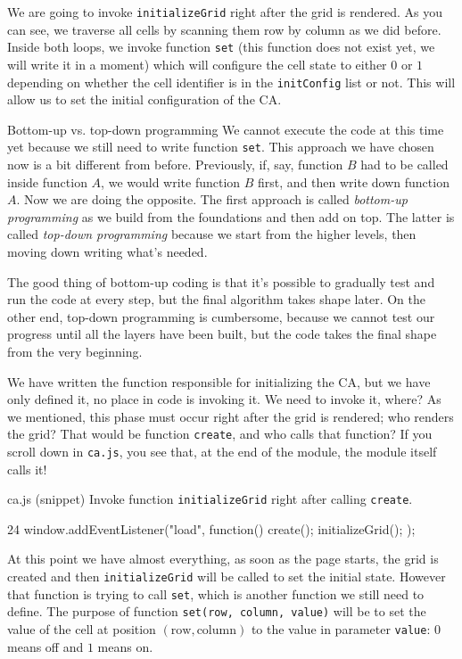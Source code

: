 We are going to invoke \texttt{initializeGrid} right after the grid is rendered. As you can see, we traverse
all cells by scanning them row by column as we did before. Inside both loops, we invoke function \texttt{set}
(this function does not exist yet, we will write it in a moment) which will configure the cell state to either
$0$ or $1$ depending on whether the cell identifier is in the \texttt{initConfig} list or not. This will allow us
to set the initial configuration of the CA.

\begin{important}{Bottom-up vs. top-down programming}
We cannot execute the code at this time yet because we still need to write function \texttt{set}.
This approach we have chosen now is a bit different from before. Previously, if, say, function $B$ had to
be called inside function $A$, we would write function $B$ first, and then write down function $A$. Now we are
doing the opposite. The first approach is called \textit{bottom-up programming}
as we build from the foundations and then add on top.
The latter is called \textit{top-down programming} because we start from the higher levels, then moving down
writing what's needed.

The good thing of bottom-up coding is that it's possible to gradually test and run the code at 
every step, but the final algorithm takes
shape later. On the other end, top-down programming is cumbersome, because we cannot test our progress until
all the layers have been built, but the code takes the final shape from the very beginning.
\end{important}

We have written the function responsible for initializing the CA, but we have only defined it, no place in code
is invoking it. We need to invoke it, where? As we mentioned, this phase must occur right after the grid is
rendered; who renders the grid? That would be function \texttt{create}, and who calls that function? If you
scroll down in \texttt{ca.js}, you see that, at the end of the module, the module itself calls it!

\begin{programcode}{ca.js (snippet)}
Invoke function \texttt{initializeGrid} right after calling \texttt{create}.
\begin{codeh1}{2}{4}
window.addEventListener("load", function(){
  create();
  initializeGrid();
});
\end{codeh1}
\end{programcode}

At this point we have almost everything, as soon as the page starts, the grid is created and then
\texttt{initializeGrid} will be called to set the initial state. However that function is trying to
call \texttt{set}, which is another function we still need to define. The purpose of function
\texttt{set(row, column, value)} will be to set the value of the cell at position
$(\text{row}, \text{column})$ to the value in parameter \texttt{value}: $0$ means off and $1$ means on.

